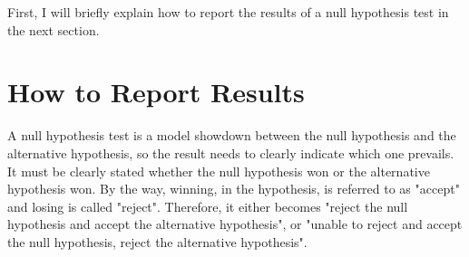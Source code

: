 \documentclass{ltjsbook}
\begin{document}
First, I will briefly explain how to report the results of a null hypothesis test in the next section.

\section{How to Report Results}
A null hypothesis test is a model showdown between the null hypothesis and the alternative hypothesis, so the result needs to clearly indicate which one prevails. It must be clearly stated whether the null hypothesis won or the alternative hypothesis won. By the way, winning, in the hypothesis, is referred to as "accept" and losing is called "reject". Therefore, it either becomes "reject the null hypothesis and accept the alternative hypothesis", or "unable to reject and accept the null hypothesis, reject the alternative hypothesis".
\end{document}
